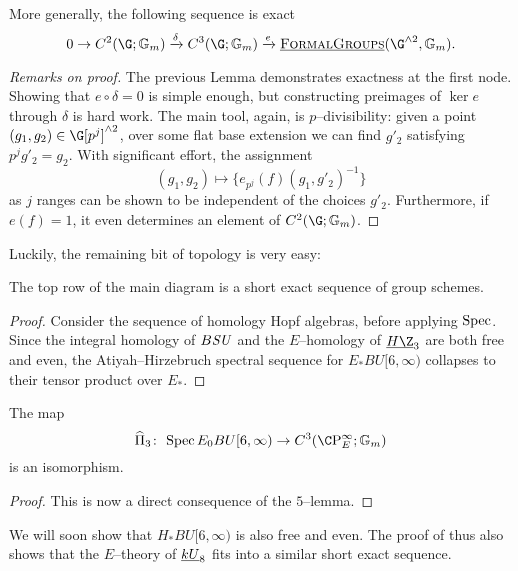 \begin{lemma}
More generally, the following sequence is exact \[0 \to C^2(\G; \Gm) \xrightarrow\delta C^3(\G; \Gm) \xrightarrow{e} \InternalHom{FormalGroups}(\G^{\sm 2}, \Gm).\]
\end{lemma}
\begin{proof}[Remarks on proof]
The previous Lemma demonstrates exactness at the first node.  Showing that \(e \circ \delta = 0\) is simple enough, but constructing preimages of \(\ker e\) through \(\delta\) is hard work.  The main tool, again, is \(p\)--divisibility: given a point \((g_1, g_2) \in \G[p^j]^{\sm 2}\), over some flat base extension we can find \(g'_2\) satisfying \(p^j g'_2 = g_2\).  With significant effort, the assignment \[(g_1, g_2) \mapsto \{e_{p^j}(f)(g_1, g'_2)^{-1}\}\] as \(j\) ranges can be shown to be independent of the choices \(g'_2\).  Furthermore, if \(e(f) = 1\), it even determines an element of \(C^2(\G; \Gm)\).
\end{proof}

Luckily, the remaining bit of topology is very easy:

\begin{lemma}\label{ASTopologyExactSequence}
The top row of the main diagram is a short exact sequence of group schemes.
\end{lemma}
\begin{proof}
Consider the sequence of homology Hopf algebras, before applying \(\operatorname{Spec}\).  Since the integral homology of \(B\mathit{SU}\) and the \(E\)--homology of \(\OS{H\Z}{3}\) are both free and even, the Atiyah--Hirzebruch spectral sequence for \(E_* BU[6, \infty)\) collapses to their tensor product over \(E_*\).
\end{proof}

\begin{corollary}
The map \[\widehat \Pi_3\co \Spec E_0 BU[6, \infty) \to C^3(\CP^\infty_E; \Gm)\] is an isomorphism.
\end{corollary}
\begin{proof}
This is now a direct consequence of the \(5\)--lemma.
\end{proof} 

\begin{remark}
We will soon show that \(H_* BU[6, \infty)\) is also free and even.  The proof of  thus also shows that the \(E\)--theory of \(\underline{\smash{kU}}_{8}\) fits into a similar short exact sequence.
\end{remark}

